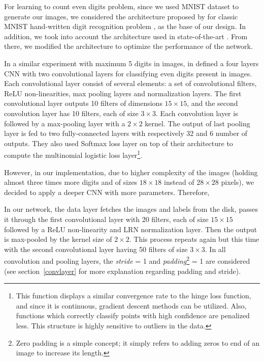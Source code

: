 For learning to count even digits problem, since we used MNIST dataset to generate our images, we considered the architecture proposed by \citeauthor{lecun1995comparison} for classic MNIST hand-written digit recognition problem \cite{lecun1995comparison}, as the base of our design. In addition, we took into account the architecture used in state-of-the-art \cite{segui2015learning}. From there, we modified the architecture to optimize the performance of the network. 
 

\noindent In a similar experiment with maximum 5 digits in images, \citeauthor{segui2015learning} in \cite{segui2015learning} defined a four layers CNN with two convolutional layers for classifying even digits present in images. Each convolutional layer consist of several elements: a set of convolutional filters, ReLU non-linearities, max pooling layers and normalization layers. The first convolutional layer outputs 10 filters of dimensions $15\times15$, and the second convolution layer has 10 filters, each of size $3\times3$. Each convolution layer is followed by a max-pooling layer with a $2\times2$ kernel. The output of last pooling layer is fed to two fully-connected layers with respectively 32 and 6 number of outputs. They also used Softmax loss layer on top of their architecture to compute the multinomial logistic loss layer\footnote{This function displays a similar convergence rate to the hinge loss function, and since it is continuous, gradient descent methods can be utilized. Also, functions which correctly classify points with high confidence are penalized less. This structure is highly sensitive to outliers in the data.}. 


\noindent However, in our implementation, due to higher complexity of the images (holding almost three times more digits and of sizes $18\times18$ instead of $28\times28$ pixels), we decided to apply a deeper CNN with more parameters. Therefore, 

In our network, the data layer fetches the images and labels from the disk, passes it through the first convolutional layer with 20 filters, each of size $15\times15$ followed by a ReLU non-linearity and LRN normalization layer. Then the output is max-pooled by the  kernel size of $2\times2$. This process repeats again but this time with the second convolutional layer having 50 filters of size $3\times3$. In all convolution and pooling layers, the \textit{stride} = 1 and \textit{padding}\footnote{Zero padding is a simple concept; it simply refers to adding zeros to end of an image to increase its length.} = 1 are considered (see section~\ref{convlayer} for more explanation regarding padding and stride). 


